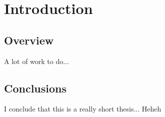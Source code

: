 \chapter{Introduction}
\section{\label{section:overview}Overview}

A lot of work to do...

\section{Conclusions}
I conclude that this is a really short thesis... Heheh

